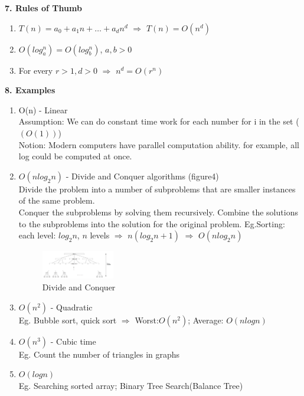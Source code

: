 \textbf{7. Rules of Thumb} 
\begin{enumerate}
\item 
$T(n) = a_{0} + a_{1}n + \dots + a_{d}n^{d}$ $\Rightarrow$ $T(n) = O(n^{d})$
\item
$O(log_{a}^{n}) = O(log_{b}^{n})$,  $a, b>0$ 
\item
For every $r>1, d>0$ $\Rightarrow$ $n^{d} = O(r^{n})$ 
\end{enumerate}

\pagebreak
\textbf{8. Examples}
\begin{enumerate}
\item 
O(n) - Linear\\ 
Assumption: We can do constant time work for each number for i in the set ($(O(1))$)\\
Notion: Modern computers have parallel computation ability. for example, all log could be computed at once.
\item
$O(n log_{2}n)$ - Divide and Conquer algorithms (figure4)\\ 
Divide the problem into a number of subproblems that are smaller instances of the same problem.\\
Conquer the subproblems by solving them recursively.
Combine the solutions to the subproblems into the solution for the original problem.
Eg.Sorting: each level: $log_{2}n$, $n$ levels $\Rightarrow$ $n (log_{2}n +1)$ $\Rightarrow$ $O(n log_{2}n)$
\begin{figure}
\centering
\includegraphics[width=0.3\textwidth]{divide_and_conquer.png}
\caption{\label{fig:divide_and_conquer}Divide and Conquer}
\end{figure}
\item
$O(n^{2})$ - Quadratic\\ 
Eg. Bubble sort, quick sort $\Rightarrow$ Worst:$O(n^{2})$; Average: $O(nlogn)$
\item
$O(n^{3})$ - Cubic time\\ 
Eg. Count the number of triangles in graphs
\item
$O(logn)$\\
Eg. Searching sorted array; Binary Tree Search(Balance Tree)
\end{enumerate}


